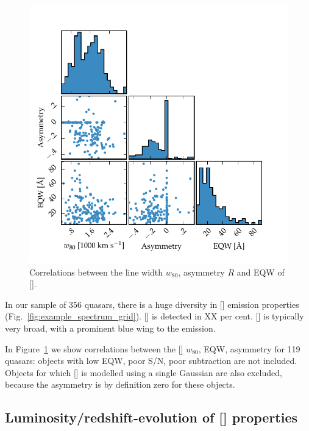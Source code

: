 \begin{figure}
    \includegraphics[width=\columnwidth]{figures/chapter04/parameters_grid.pdf} 
    \caption[{Correlations between the line width $w_{80}$, asymmetry $R$ and \ac{EQW} of [].}]{Correlations between the line width $w_{80}$, asymmetry $R$ and \ac{EQW} of [].}     
    \label{fig:parameters_grid}
\end{figure}

In our sample of 356 quasars, there is a huge diversity in [] emission properties (Fig.~\ref{fig:example_spectrum_grid}). 
[] is detected in XX per cent. 
[] is typically very broad, with a prominent blue wing to the emission.  

In Figure~\ref{fig:parameters_grid} we show correlations between the [] $w_{80}$, EQW, asymmetry for 119 quasars: objects with low \ac{EQW}, poor \ac{S/N}, poor  subtraction are not included. 
Objects for which [] is modelled using a single Gaussian are also excluded, because the asymmetry is by definition zero for these objects.   

\subsection{Luminosity/redshift-evolution of [] properties}

